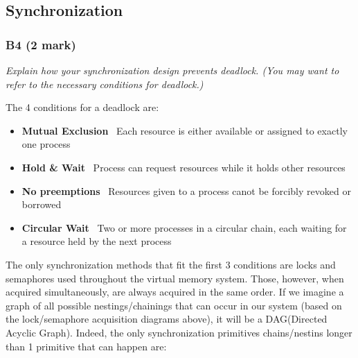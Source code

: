 \documentclass{report}
\newcommand{\question}[1]{\textit{#1} \ }
\newcommand{\bullpara}[2]{\item \textbf{#1} \ #2}
\newcommand{\compitem}[1]{\begin{itemize}\setlength\itemsep{-0.1em}#1\end{itemize}}
\begin{document}
		\subsection*{Synchronization}
			\subsubsection*{B4 (2 mark)}
				\question{Explain how your synchronization design prevents deadlock.
				(You may want to refer to the necessary conditions for deadlock.)}

				The 4 conditions for a deadlock are:
				\compitem{
					\bullpara{Mutual Exclusion}{Each resource is either available or assigned to exactly one process}
					\bullpara{Hold \& Wait}{Process can request resources while it holds other resources}
					\bullpara{No preemptions}{Resources given to a process canot be forcibly revoked or borrowed}
					\bullpara{Circular Wait}{Two or more processes in a circular chain, each waiting for a resource held by the next process}
				}
				The only synchronization methods that fit the first 3 conditions are locks and semaphores used throughout the virtual memory system.
				Those, however, when acquired simultaneously, are always acquired in the same order. If we imagine a graph of all possible
				nestings/chainings that can occur in our system (based on the lock/semaphore acquisition diagrams above), it will be a DAG(Directed Acyclic Graph).
				Indeed, the only synchronization primitives chains/nestins longer than 1 primitive that can happen are:
\end{document}
